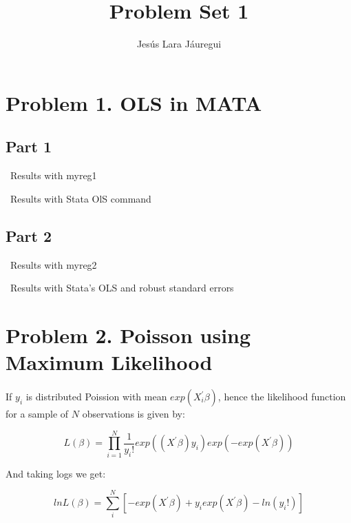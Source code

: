 \documentclass[12pt]{article}
\begin{document}
\author{Jesús Lara Jáuregui}
\title{Problem Set 1}
\maketitle


\section{Problem 1. OLS in MATA}
\subsection{Part 1}
\ Results with myreg1
\begin{stlog}\end{stlog}
\ Results with Stata OlS command
\begin{stlog}\end{stlog}
\subsection{Part 2}
\ Results with myreg2
\begin{stlog}\end{stlog}
\ Results with Stata's OLS and robust standard errors
\begin{stlog}\end{stlog}

\section{Problem 2. Poisson using Maximum Likelihood}

If $y_i$ is distributed Poission with mean $exp(X^{'}_i \beta)$, hence the likelihood function for a sample of $N$ observations is given by:

$$ L(\beta)=\prod_{i=1}^{N}\frac{1}{y_{i}!}exp((X^{'}\beta)y_i)exp(-exp(X^{'}\beta))$$


And taking logs we get:

$$lnL(\beta)=\sum_{i}^{N}[-exp(X^{'}\beta)+y_i exp(X^{'}\beta)-ln(y_i !)]$$
\end{document}
